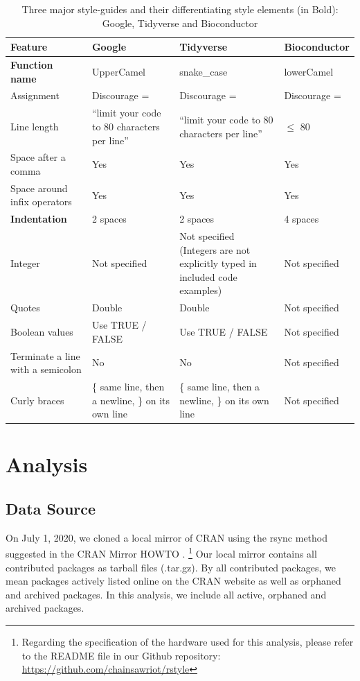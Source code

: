\begin{table}

\caption{\label{tab:table1}Three major style-guides and their differentiating style elements (in Bold): Google, Tidyverse and Bioconductor}
\centering
\begin{tabular}[t]{LLLL}\toprule
Feature & Google & Tidyverse & Bioconductor\\
\midrule
\textbf{Function name} & UpperCamel & snake\_case & lowerCamel\\
Assignment & Discourage = & Discourage = & Discourage =\\
Line length & “limit your code to 80 characters per line” & “limit your code to 80 characters per line” & $\leqslant$ 80\\
Space after a comma & Yes & Yes & Yes\\
Space around infix operators & Yes & Yes & Yes\\
\textbf{Indentation} & 2 spaces & 2 spaces & 4 spaces\\
Integer & Not specified & Not specified (Integers are not explicitly typed in included code examples) & Not specified\\
Quotes & Double & Double & Not specified\\
Boolean values & Use TRUE / FALSE & Use TRUE / FALSE & Not specified\\
Terminate a line with a semicolon & No & No & Not specified\\
Curly braces & \{ same line, then a newline, \} on its own line & \{ same line, then a newline, \} on its own line & Not specified\\
\bottomrule
\end{tabular}
\end{table}


\section{Analysis}
\subsection{Data Source}

On July 1, 2020, we cloned a local mirror of CRAN using the rsync method suggested in the CRAN Mirror HOWTO \citep{cranminihowto}. \footnote{Regarding the specification of the hardware used for this analysis, please refer to the README file in our Github repository: \url{https://github.com/chainsawriot/rstyle}} Our local mirror contains all contributed packages as tarball files (.tar.gz). By all contributed packages, we mean packages actively listed online on the CRAN website as well as orphaned and archived packages. In this analysis, we include all active, orphaned and archived packages.

